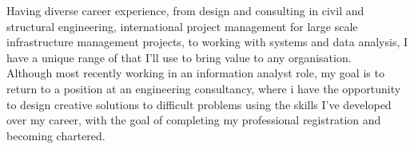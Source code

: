%
%
%
\par{Having diverse career experience, from design and consulting in civil and structural engineering, international project management for large scale infrastructure management projects, to working with systems and data analysis, I have a unique range of that I'll use to bring value to any organisation. \\

Although most recently working in an information analyst role, my goal is to return to a position at an engineering consultancy, where i have the opportunity to design creative solutions to difficult problems using the skills I’ve developed over my career, with the goal of completing my professional registration and becoming chartered. \\


}